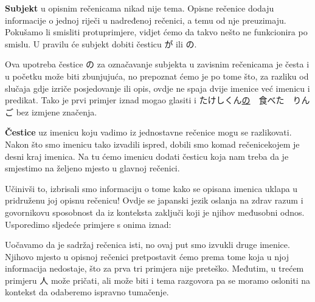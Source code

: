 	\vspace{5pt}
	\textbf{Subjekt} u opisnim rečenicama nikad nije tema. Opisne rečenice dodaju informacije o jednoj riječi u nadređenoj rečenici, a temu od nje preuzimaju. Pokušamo li smisliti protuprimjere, vidjet ćemo da takvo nešto ne funkcionira po smislu. U pravilu će subjekt dobiti česticu が ili の.
	
	Ova upotreba čestice の za označavanje subjekta u zavisnim rečenicama je česta i u početku može biti zbunjujuća, no prepoznat ćemo je po tome što, za razliku od slučaja gdje izriče posjedovanje ili opis, ovdje ne spaja dvije imenice već imenicu i predikat. Tako je prvi primjer iznad mogao glasiti i たけしくん\underline{の}　食べた　りんご bez izmjene značenja.
	
	\vspace{5pt}
	\textbf{Čestice} uz imenicu koju vadimo iz jednostavne rečenice mogu se razlikovati. Nakon što smo imenicu tako izvadili ispred, dobili smo komad rečenice\footnotemark[5] kojem je desni kraj imenica. Na tu ćemo imenicu dodati česticu koja nam treba da je smjestimo na željeno mjesto u glavnoj rečenici.
	
	
	Učinivši to, izbrisali smo informaciju o tome kako se opisana imenica uklapa u pridruženu joj opisnu rečenicu! Ovdje se japanski jezik oslanja na zdrav razum i govornikovu sposobnost da iz konteksta zaključi koji je njihov međusobni odnos. Usporedimo sljedeće primjere s onima iznad:
	
	\begin{reibun}
	\end{reibun}

	Uočavamo da je sadržaj rečenica isti, no ovaj put smo izvukli druge imenice. Njihovo mjesto u opisnoj rečenici pretpostavit ćemo prema tome koja u njoj informacija nedostaje, što za prva tri primjera nije preteško. Međutim, u trećem primjeru 人 može pričati, ali može biti i tema razgovora pa se moramo osloniti na kontekst da odaberemo ispravno tumačenje.


